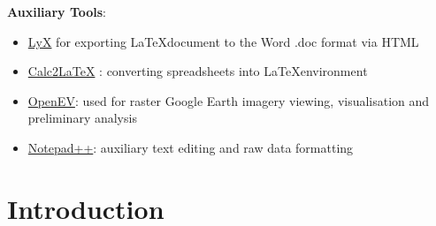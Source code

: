 \documentclass[10pt, a4paper]{article}
\begin{document}
	\vspace{1ex}
	\textbf{Auxiliary Tools}:
	\begin{itemize}
		\item \href{http://www.lyx.org/}{LyX} for exporting \LaTeX document to the Word .doc format via HTML
		\item \href{http://calc2latex.sourceforge.net/}{Calc2LaTeX} : converting spreadsheets into \LaTeX environment
		\item \href{http://openev.sourceforge.net/}{OpenEV}: used for raster Google Earth imagery viewing, visualisation and preliminary analysis
		\item \href{http://www.notepad-plus-plus.org/}{Notepad++}: auxiliary text editing and raw data formatting
	\end{itemize}
	
\pagebreak

\section*{}
\setcounter{lofdepth}{2}
\listoffigures
\pagebreak

\section*{}
\listoftables
\pagebreak

\section{Introduction}\label{sec:1}

\end{document}
